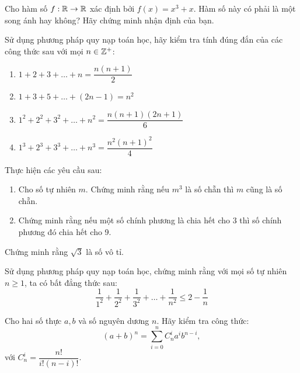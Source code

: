 \begin{exercise} %
    Cho hàm số $f: \mathbb{R} \to \mathbb{R}$ xác định bởi $f(x) = x^3 + x$. Hàm số này có phải là một song ánh hay không? Hãy chứng minh nhận định của bạn.
\end{exercise}

\begin{exercise} %
    Sử dụng phương pháp quy nạp toán học, hãy kiểm tra tính đúng đắn của các công thức sau với mọi $n \in \mathbb{Z}^+$:
    \begin{enumerate}[label=\alph*)]            
        \item $1+2+3+\dots+n = \dfrac{n(n+1)}{2}$

        \item $1+3+5+\dots+(2n-1) = n^2$
        
        \item $1^2+2^2+3^2+\dots+n^2 = \dfrac{n(n+1)(2n+1)}{6}$
        
        \item $1^3+2^3+3^3+\dots+n^3 = \dfrac{n^2(n+1)^2}{4}$
    \end{enumerate}
\end{exercise}

\begin{exercise} %
    Thực hiện các yêu cầu sau:
    \begin{enumerate}[label=\alph*)]
        \item Cho số tự nhiên $m$. Chứng minh rằng nếu $m^3$ là số chẵn thì $m$ cũng là số chẵn.
        \item Chứng minh rằng nếu một số chính phương là chia hết cho 3 thì số chính phương đó chia hết cho 9.
    \end{enumerate}
\end{exercise}

\begin{exercise} %
    Chứng minh rằng $\sqrt{3}$ là số vô tỉ.
\end{exercise}

\begin{exercise} %
    Sử dụng phương pháp quy nạp toán học, chứng minh rằng với mọi số tự nhiên $n \ge 1$, ta có bất đẳng thức sau:
    \[
        \dfrac{1}{1^2} + \dfrac{1}{2^2} + \dfrac{1}{3^2} + \dots + \dfrac{1}{n^2} \le 2 - \dfrac{1}{n}
    \]
\end{exercise}

\begin{exercise} %
    Cho hai số thực $a, b$ và số nguyên dương $n$. Hãy kiểm tra công thức:
    \[
        (a+b)^n = \sum_{i=0}^{n} C_n^i a^i b^{n-i},
    \]
    với $C_n^i = \dfrac{n!}{i!(n-i)!}$.
\end{exercise}

